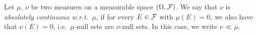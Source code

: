 %	

\begin{definition}
	Let $\mu$, $\nu$ be two measures on a measurable space $(\Omega, \mathcal F)$.
	We say that $\nu$ is \emph{absolutely continuous w.r.t.\ $\mu$}, if for every $E\in\mathcal F$ with $\mu(E)=0$, we also have that $\nu(E)=0$, i.e.\ $\mu$-null sets are $\nu$-null sets. In this case, we write $\nu\ll\mu$.
\end{definition}



